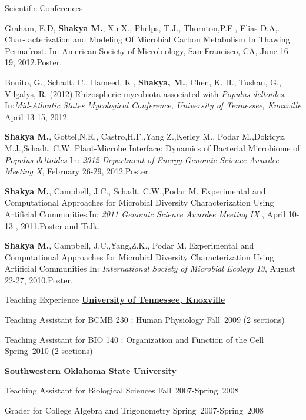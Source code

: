 \documentclass{resume} %
\begin{document}
\begin{rSection}{Scientific Conferences}
\item Graham, E.D, \textbf{Shakya M.}, Xu X., Phelps, T.J., Thornton,P.E., Elias D.A,. Char- acterization and Modeling Of Microbial Carbon Metabolism In Thawing Permafrost. In: American Society of Microbiology, San Francisco, CA, June 16 - 19, 2012.Poster.


\item Bonito, G., Schadt, C., Hameed, K., \textbf{Shakya, M.}, Chen, K. H., Tuskan, G., Vilgalys, R. (2012).Rhizospheric mycobiota associated with \textit{Populus deltoides}. In:\emph{Mid-Atlantic States Mycological Conference, University of Tennessee, Knoxville} April 13-15, 2012.

\item \textbf{Shakya M.}, Gottel,N.R., Castro,H.F.,Yang Z.,Kerley M., Podar M.,Doktcyz, M.J.,Schadt, C.W. Plant-Microbe Interface: Dynamics of Bacterial Microbiome of \textit{Populus deltoides}  In: \emph{2012 Department of Energy Genomic Science Awardee Meeting X}, February 26-29, 2012.Poster.

\item \textbf{Shakya M.}, Campbell, J.C., Schadt, C.W.,Podar M. Experimental and Computational Approaches for Microbial Diversity Characterization Using Artificial Communities.In: \emph{2011 Genomic Science Awardee Meeting IX }, April 10-13 , 2011.Poster and Talk.

\item \textbf{Shakya M.}, Campbell, J.C.,Yang,Z.K., Podar M. Experimental and Computational Approaches for Microbial Diversity Characterization Using Artificial Communities In: \emph{International Society of Microbial Ecology 13}, August 22-27, 2010.Poster.

\end{rSection}

\begin{rSection}{Teaching Experience}{}{}{}
\href{http://www.utk.edu}{\bf University of Tennessee, Knoxville}
\item Teaching Assistant for BCMB 230 : Human Physiology Fall~2009 (2 sections)
\item Teaching Assistant for BIO 140 : Organization and Function of the Cell  Spring~2010 (2 sections)

\href{http://www.swosu.edu}{\textbf{Southwestern Oklahoma State University}}
 \item Teaching Assistant for Biological Sciences Fall~2007-Spring~2008
\item Grader for College Algebra and Trigonometry Spring~2007-Spring~2008

\end{rSection}
\end{document}

